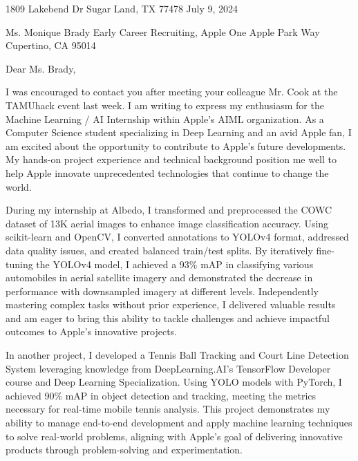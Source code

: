 \documentclass{ExpressiveCoverLetter}
\begin{document}
\vspace{0.25in}
1809 Lakebend Dr \newline
Sugar Land, TX 77478 \newline
July 9, 2024

\vspace{0.15in}

Ms. Monique Brady \newline
Early Career Recruiting, Apple \newline
One Apple Park Way \newline
Cupertino, CA 95014 \newline

Dear Ms. Brady, \newline

I was encouraged to contact you after meeting your colleague Mr. Cook at
the TAMUhack event last week. I am writing to express my enthusiasm for
the Machine Learning / AI Internship within Apple’s AIML organization.
As a Computer Science student specializing in Deep Learning and an avid
Apple fan, I am excited about the opportunity to contribute to Apple’s future developments. My
hands-on project experience and technical background position me well to
help Apple innovate unprecedented technologies that continue to change
the world. \newline

During my internship at Albedo, I transformed and preprocessed the COWC
dataset of 13K aerial images to enhance image classification accuracy.
Using scikit-learn and OpenCV, I converted annotations to YOLOv4 format,
addressed data quality issues, and created balanced train/test splits.
By iteratively fine-tuning the YOLOv4 model, I achieved a 93\% mAP in
classifying various automobiles in aerial satellite imagery and
demonstrated the decrease in performance with downsampled imagery at
different levels. Independently mastering complex tasks without prior
experience, I delivered valuable results and am eager to bring this
ability to tackle challenges and achieve impactful outcomes to Apple's
innovative projects. \newline

In another project, I developed a Tennis Ball Tracking and Court Line
Detection System leveraging knowledge from DeepLearning.AI's TensorFlow
Developer course and Deep Learning Specialization. Using YOLO models
with PyTorch, I achieved 90\% mAP in object detection and tracking,
meeting the metrics necessary for real-time mobile tennis analysis. This
project demonstrates my ability to manage end-to-end development and
apply machine learning techniques to solve real-world problems, aligning
with Apple's goal of delivering innovative products through
problem-solving and experimentation. \newline
\end{document}
